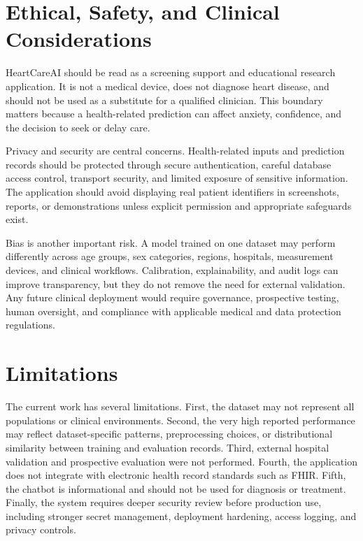 \documentclass[conference]{IEEEtran}
\begin{document}
\section{Ethical, Safety, and Clinical Considerations}
HeartCareAI should be read as a screening support and educational research application. It is not a medical device, does not diagnose heart disease, and should not be used as a substitute for a qualified clinician. This boundary matters because a health-related prediction can affect anxiety, confidence, and the decision to seek or delay care.

Privacy and security are central concerns. Health-related inputs and prediction records should be protected through secure authentication, careful database access control, transport security, and limited exposure of sensitive information. The application should avoid displaying real patient identifiers in screenshots, reports, or demonstrations unless explicit permission and appropriate safeguards exist.

Bias is another important risk. A model trained on one dataset may perform differently across age groups, sex categories, regions, hospitals, measurement devices, and clinical workflows. Calibration, explainability, and audit logs can improve transparency, but they do not remove the need for external validation. Any future clinical deployment would require governance, prospective testing, human oversight, and compliance with applicable medical and data protection regulations.

\section{Limitations}
The current work has several limitations. First, the dataset may not represent all populations or clinical environments. Second, the very high reported performance may reflect dataset-specific patterns, preprocessing choices, or distributional similarity between training and evaluation records. Third, external hospital validation and prospective evaluation were not performed. Fourth, the application does not integrate with electronic health record standards such as FHIR. Fifth, the chatbot is informational and should not be used for diagnosis or treatment. Finally, the system requires deeper security review before production use, including stronger secret management, deployment hardening, access logging, and privacy controls.
\end{document}
